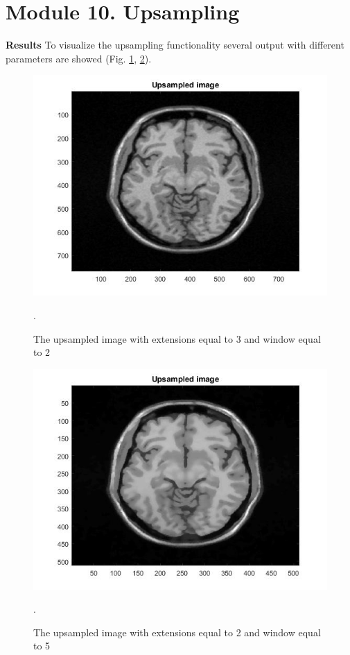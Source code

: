 \section{Module 10. Upsampling}

\textbf{Results}
\newline
To visualize the upsampling functionality several output with different parameters are showed (Fig. \ref{fig: Module10_6}, \ref{fig: Module10_7}).

\begin{figure}[H]
\centering{}\includegraphics[scale=0.5]{figures/Module_10/Module10_6}\caption{The upsampled image with extensions equal to 3 and window equal to 2}. 
\label{fig: Module10_6}
\end{figure}

\begin{figure}[H]
\centering{}\includegraphics[scale=0.5]{figures/Module_10/Module10_7}\caption{The upsampled image with extensions equal to 2 and window equal to 5}. 
\label{fig: Module10_7}
\end{figure}

